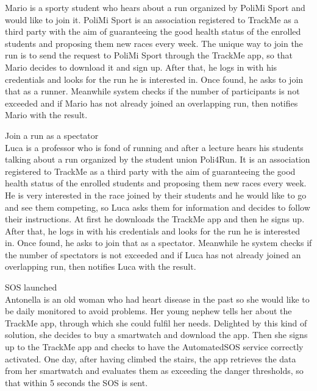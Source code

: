 \documentclass{article}
\begin{document}
\begin{legal}
\begin{legal}
\begin{legal}
{\begin{legal}
Mario is a sporty student who hears about a run organized by PoliMi Sport and would like to join it. PoliMi Sport is an association registered to TrackMe as a third party with the aim of guaranteeing the good health status of the enrolled students and proposing them new races every week. The unique way to join the run is to send the request to PoliMi Sport through the TrackMe app, so that Mario decides to download it and sign up. After that, he logs in with his credentials and looks for the run he is interested in. Once found, he asks to join that as a runner. Meanwhile system checks if the number of participants is not exceeded and if Mario has not already joined an overlapping run, then notifies Mario with the result.\\

		\item Join a run as a spectator\\

Luca is a professor who is fond of running and after a lecture hears his students talking about a run organized by the student union Poli4Run. It is an association registered to TrackMe as a third party with the aim of guaranteeing the good health status of the enrolled students and proposing them new races every week. He is very interested in the race joined by their students and he would like to go and see them competing, so Luca asks them for information and decides to follow their instructions. At first he downloads the TrackMe app and then he signs up. After that, he logs in with his credentials and looks for the run he is interested in. Once found, he asks to join that as a spectator. Meanwhile he system checks if the number of spectators is not exceeded and if Luca has not already joined an overlapping run, then notifies Luca with the result.\\

		\item SOS launched\\

Antonella is an old woman who had heart disease in the past so she would like to be daily monitored to avoid problems. Her young nephew tells her about the TrackMe app, through which she could fulfil her needs. Delighted by this kind of solution, she decides to buy a smartwatch and download the app. Then she signs up to the TrackMe app and checks to have the AutomatedSOS service correctly activated. One day, after having climbed the stairs, the app retrieves the data from her smartwatch and evaluates them as exceeding the danger thresholds, so that within 5 seconds the SOS is sent.\\



\end{legal}}
\end{legal}
\end{legal}
\end{legal}
\end{document}

